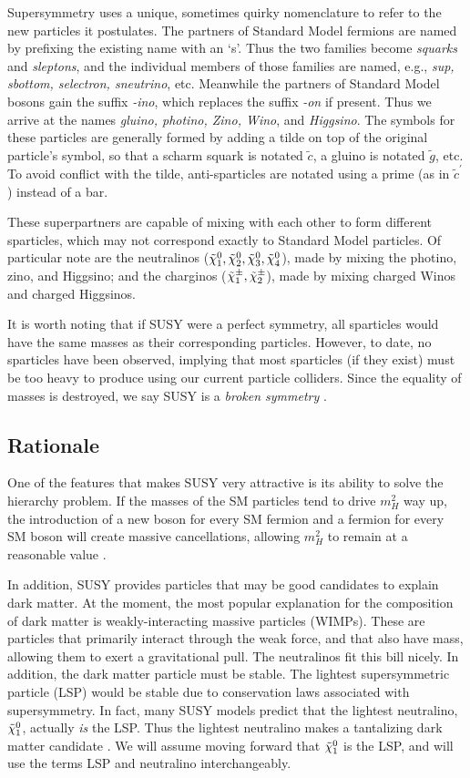 Supersymmetry uses a unique, sometimes quirky nomenclature to refer to
the new particles it postulates. The partners of Standard Model
fermions are named by prefixing the existing name with an `s'. Thus
the two families become \emph{squarks} and \emph{sleptons}, and the
individual members of those families are named, e.g., \emph{sup,
  sbottom, selectron, sneutrino}, etc. Meanwhile the partners of
Standard Model bosons gain the suffix \emph{-ino}, which replaces the
suffix \emph{-on} if present. Thus we arrive at the names
\emph{gluino, photino, Zino, Wino}, and \emph{Higgsino}. The symbols
for these particles are generally formed by adding a tilde on top of
the original particle's symbol, so that a scharm squark is notated
$\tilde{c}$, a gluino is notated $\tilde{g}$, etc. To avoid conflict
with the tilde, anti-sparticles are notated using a prime (as in
$\tilde{c}^\prime$) instead of a bar.

These superpartners are capable of mixing with each other to form
different sparticles, which may not correspond exactly to Standard
Model particles. Of particular note are the neutralinos
($\tilde{\chi}^0_1, \tilde{\chi}^0_2, \tilde{\chi}^0_3, \tilde{\chi}^0_4$), made by mixing the photino, zino,
and Higgsino; and the charginos ($\tilde{\chi}^\pm_1, \tilde{\chi}^\pm_2$), made by
mixing charged Winos and charged Higgsinos.

It is worth noting that if SUSY were a perfect symmetry, all
sparticles would have the same masses as their corresponding
particles. However, to date, no sparticles have been
observed, implying that most sparticles (if they exist) must be too
heavy to produce using our current particle colliders. Since the
equality of masses is destroyed, we say SUSY is a \emph{broken
symmetry} \cite{susyprimer}.

\subsection{Rationale}
\label{ssec:susy:rationale}

One of the features that makes SUSY very attractive is its ability to
solve the hierarchy problem. If the masses of the SM particles tend to
drive $m_H^2$ way up, the introduction of a new boson for every SM
fermion and a fermion for every SM boson will create massive
cancellations, allowing $m_H^2$ to remain at a reasonable value
\cite{susyprimer}.

In addition, SUSY provides particles that may be good candidates to
explain dark matter. At the moment, the most popular explanation for
the composition of dark matter is weakly-interacting massive particles
(WIMPs). These are particles that primarily interact through the weak
force, and that also have mass, allowing them to exert a gravitational
pull. The neutralinos fit this bill nicely. In addition, the dark
matter particle must be stable. The lightest supersymmetric particle
(LSP) would be stable due to conservation laws associated
with supersymmetry. In fact, many SUSY models predict that the lightest
neutralino, $\tilde{\chi}^0_1$, actually \emph{is} the LSP. Thus the lightest
neutralino makes a tantalizing dark matter candidate
\cite{susydarkmatter,susyprimer}. We will assume moving forward
that $\tilde{\chi}^0_1$ is the LSP, and will use the terms LSP and neutralino
interchangeably.

